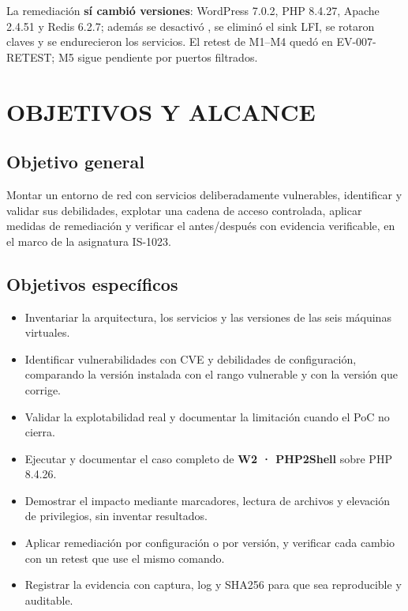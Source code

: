 \documentclass[11pt,a4paper]{article}
\newcommand{\code}[1]{\texttt{\detokenize{#1}}}
\begin{document}
La remediación \textbf{sí cambió versiones}: WordPress 7.0.2, PHP 8.4.27, Apache 2.4.51 y Redis 6.2.7; además se desactivó \code{session.upload_progress}, se eliminó el sink LFI, se rotaron claves y se endurecieron los servicios. El retest de M1--M4 quedó en EV-007-RETEST; M5 sigue pendiente por puertos filtrados.


\section{OBJETIVOS Y ALCANCE}

\subsection{Objetivo general}

Montar un entorno de red con servicios deliberadamente vulnerables, identificar y validar sus debilidades, explotar una cadena de acceso controlada, aplicar medidas de remediación y verificar el antes/después con evidencia verificable, en el marco de la asignatura IS-1023.

\subsection{Objetivos específicos}

\begin{itemize}
    \item Inventariar la arquitectura, los servicios y las versiones de las seis máquinas virtuales.
    \item Identificar vulnerabilidades con CVE y debilidades de configuración, comparando la versión instalada con el rango vulnerable y con la versión que corrige.
    \item Validar la explotabilidad real y documentar la limitación cuando el PoC no cierra.
    \item Ejecutar y documentar el caso completo de \textbf{W2 · PHP2Shell} sobre PHP 8.4.26.
    \item Demostrar el impacto mediante marcadores, lectura de archivos y elevación de privilegios, sin inventar resultados.
    \item Aplicar remediación por configuración o por versión, y verificar cada cambio con un retest que use el mismo comando.
    \item Registrar la evidencia con captura, log y SHA256 para que sea reproducible y auditable.
\end{itemize}
\end{document}
